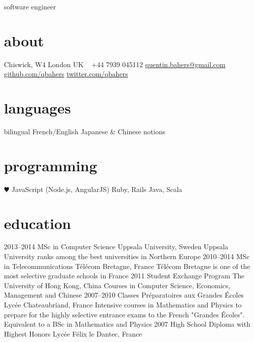 \documentclass[]{friggeri-cv}
\begin{document}
       {software engineer}


\begin{aside}
  \section{about}
    Chiswick, W4
    London
    UK
    ~
    +44 7939 045112
    \href{mailto:quentin.bahers@gmail.com}{quentin.bahers@gmail.com}
    \href{http://github.com/qbahers}{github.com/qbahers}
    \href{http://twitter.com/qbahers}{twitter.com/qbahers}
  \section{languages}
    bilingual French/English
    Japanese \& Chinese notions
  \section{programming}
    {\color{red} $\varheartsuit$} JavaScript
    (Node.js, AngularJS)
    Ruby, Rails
    Java, Scala
\end{aside}



\section{education}

\begin{entrylist}
  \entry
    {2013–2014}
    {MSc in Computer Science}
    {Uppsala University, Sweden}
    {Uppsala University ranks among the best universities in Northern Europe}
  \entry
    {2010–2014}
    {MSc in Telecommunications}
    {Télécom Bretagne, France}
    {Télécom Bretagne is one of the most selective graduate schools in France}
  \entry
    {2011}
    {Student Exchange Program}
    {The University of Hong Kong, China}
    {Courses in Computer Science, Economics, Management and Chinese}
  \entry
    {2007–2010}
    {Classes Préparatoires aux Grandes Écoles}
    {Lycée Chateaubriand, France}
    {Intensive courses in Mathematics and Physics to prepare for the highly selective entrance exams to the French "Grandes Écoles".
    \\ Equivalent to a BSc in Mathematics and Physics}
  \entry
    {2007}
    {High School Diploma with Highest Honors}
    {Lycée Félix le Dantec, France}
    {}
\end{entrylist}
\end{document}
